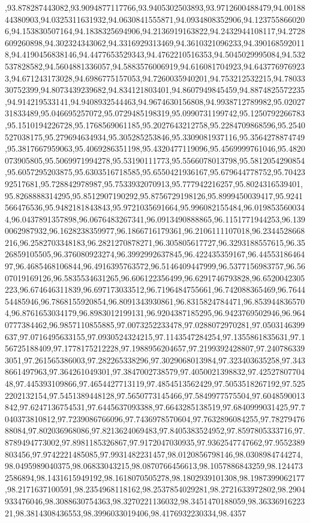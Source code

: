 \begin{pylabcode}[plotsession]
,93.878287443082,93.9094877117766,93.9405302503893,93.9712600488479,94.0018844380903,94.0325311631932,94.0630841555871,94.0934808352906,94.1237558660206,94.153830507164,94.1838325694906,94.2136919163822,94.2432944108117,94.2728609260898,94.302324343062,94.3316929313469,94.3610321096233,94.3901685920118,94.4190456838146,94.4477653529343,94.4762210516353,94.5045029995084,94.532537828582,94.5604881336057,94.5883576006919,94.616081704923,94.6437769769233,94.671243173028,94.6986775157053,94.7260035940201,94.753212532215,94.7803330752399,94.8073439239682,94.834121803401,94.8607949845459,94.8874825572235,94.914219533141,94.9408932544463,94.9674630156808,94.9938712789982,95.0202731833489,95.046695257072,95.0729485198319,95.0990731199742,95.1250792266783,95.1510194226728,95.1768569061185,95.2027643212758,95.2284709868596,95.2540527038175,95.279694634934,95.305285253846,95.3309081937116,95.3564278874749,95.3817667959063,95.4069286351198,95.4320477119096,95.4569999761046,95.4820073905805,95.5069971994278,95.53190111773,95.5566078013798,95.5812054290854,95.6057295203875,95.6303516718585,95.6550421936167,95.679644778752,95.7042392517681,95.728842978987,95.7533932070913,95.777942216257,95.8024316539401,95.8268888314295,95.8512907190292,95.8756729198126,95.8999450039417,95.9241566476536,95.9482181843843,95.9721035691664,95.996082155484,96.0198535600344,96.0437891357898,96.0676483267341,96.0913490888865,96.1151771944253,96.1390062987932,96.1628238359977,96.1866716179361,96.2106111107018,96.2344528668216,96.2582703348183,96.2821270878271,96.305805617727,96.3293188557615,96.3526859105505,96.376080923274,96.3992992637845,96.422435359167,96.4455318646497,96.4685468106844,96.4916395763572,96.5146409447999,96.5377156983757,96.5607019169126,96.5835534631265,96.606122356499,96.6291746793828,96.6520042305223,96.674646311839,96.697173033512,96.7196484755661,96.742088365469,96.764454485946,96.7868155920854,96.8091343930861,96.8315824784471,96.8539448365704,96.8761653034179,96.8983012199131,96.9204387185295,96.9423769502946,96.9640777384462,96.9857110855885,97.0073252233478,97.0288072970281,97.0503146399637,97.0716495633155,97.0930524324215,97.1143547284254,97.1355861835631,97.156725188409,97.1778175212228,97.1988956204657,97.2199392428807,97.2407863393051,97.261565386003,97.282265338296,97.3029068013984,97.323403635258,97.3438661497963,97.364261049301,97.3847002738579,97.4050021398832,97.4252780770448,97.445393109866,97.4654427713119,97.4854513562429,97.5053518267192,97.5252202132154,97.5451389448128,97.5650773145466,97.5849977575504,97.6048590013842,97.6247136754531,97.6445637093388,97.6643285138519,97.6840999031425,97.7040373810812,97.7239086766096,97.7436978570604,97.7632896084255,97.7827947688084,97.802036968086,97.8213624069483,97.8405383524952,97.8597805333716,97.8789494773002,97.8981185326867,97.9172047030935,97.9362547747662,97.9552389803456,97.9742221485085,97.9931482231457,98.0120856798146,98.0308984744274,98.0495989040375,98.06833043215,98.0870766456613,98.1057886843259,98.1244732586894,98.1431615949192,98.1618070505278,98.1802939101308,98.1987399062177,98.2171637100591,98.2354968118162,98.2537854029281,98.2721633972802,98.2904933476046,98.3088630754363,98.3270221136032,98.3451470188059,98.3633691622321,98.3814308436553,98.3996033019406,98.4176932230334,98.4357
\end{pylabcode}
